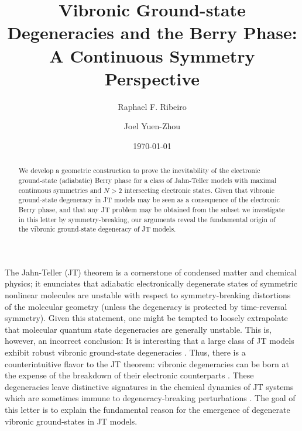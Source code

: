 \documentclass[superscriptaddress,showpacs,amsmath,amssymb,pra,twocolumn]{revtex4-1}
\def\coloredauthor#1{\author{\textcolor{CITECOL}{#1}}} %
\begin{document}
\coloredauthor{Raphael F. Ribeiro}
\coloredauthor{Joel Yuen-Zhou}
\date{\today}
\title{Vibronic Ground-state Degeneracies and the Berry Phase: A Continuous Symmetry Perspective}





\begin{abstract}
We develop a geometric construction to prove the inevitability of the electronic ground-state (adiabatic) Berry phase for a class of Jahn-Teller models with maximal continuous symmetries and $N > 2$ intersecting electronic states. Given that vibronic ground-state degeneracy in JT models may be seen as a consequence of the electronic Berry phase, and that any JT problem may be obtained from the subset we investigate in this letter by symmetry-breaking, our arguments reveal the fundamental origin of the vibronic ground-state degeneracy of JT models.
\end{abstract}
\maketitle
The Jahn-Teller (JT) theorem \cite{jahn_stability_1937,jahn_stability_1938}
is a cornerstone of condensed matter and chemical physics; it enunciates
that adiabatic electronically degenerate states of symmetric nonlinear
molecules are unstable with respect to symmetry-breaking distortions
of the molecular geometry (unless the degeneracy is protected by time-reversal
symmetry). Given this statement, one might be tempted to loosely extrapolate
that molecular quantum state degeneracies are generally unstable.
This is, however, an incorrect conclusion: It is interesting that a
large class of JT models exhibit robust vibronic ground-state degeneracies
\cite{longuet-higgins_studies_1958,obrien_dynamic_1969-2,zwanziger_topological_1987,ham_berrys_1987,ham_role_1990,cullerne_jahn-teller_1994,de_los_rios_dynamical_1996,chancey1997jahn,bersuker_jahn-teller_2006,requist_molecular_2016-1,ryabinkin_geometric_2013}.
Thus, there is a counterintuitive flavor to the JT theorem: vibronic
degeneracies can be born at the expense of the breakdown of their
electronic counterparts \cite{bersuker_jahn-teller_2006,chancey1997jahn}. These degeneracies leave distinctive signatures in the chemical dynamics of JT systems which are sometimes immune to degeneracy-breaking perturbations \cite{ryabinkin_geometric_2013,joubert-doriol_molecular_2017}.
The goal of this letter is to explain the fundamental reason for the
emergence of degenerate vibronic ground-states in JT models. 
\end{document}
